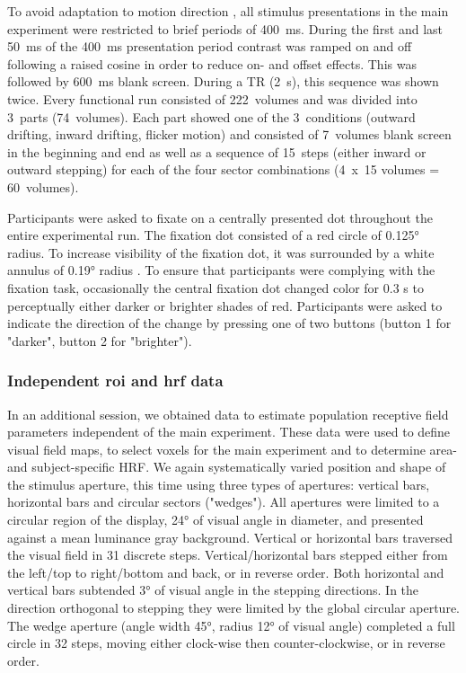 To avoid adaptation to motion direction \parencite{Fu2004, Schellart2004}, all stimulus presentations in the main experiment were restricted to brief periods of 400~ms. During the first and last 50~ms of the 400~ms presentation period contrast was ramped on and off following a raised cosine in order to reduce on- and offset effects. This was followed by 600~ms blank screen. During a TR (2~s), this sequence was shown twice. Every functional run consisted of 222~volumes and was divided into 3~parts (74~volumes). Each part showed one of the 3~conditions (outward drifting, inward drifting, flicker motion) and consisted of 7~volumes blank screen in the beginning and end as well as a sequence of 15~steps (either inward or outward stepping) for each of the four sector combinations (4~x~15 volumes = 60~volumes).

Participants were asked to fixate on a centrally presented dot throughout the entire experimental run. The fixation dot consisted of a red circle of 0.125° radius. To increase visibility of the fixation dot, it was surrounded by a white annulus of 0.19° radius \parencite{Harvey2016}. To ensure that participants were complying with the fixation task, occasionally the central fixation dot changed color for 0.3 s to perceptually either darker or brighter shades of red. Participants were asked to indicate the direction of the change by pressing one of two buttons (button 1 for "darker", button 2 for "brighter").

\subsubsection{Independent roi and hrf data}
In an additional session, we obtained data to estimate population receptive field parameters independent of the main experiment. These data were used to define visual field maps, to select voxels for the main experiment and to determine area- and subject-specific HRF. We again systematically varied position and shape of the stimulus aperture, this time using three types of apertures: vertical bars, horizontal bars and circular sectors ("wedges"). All apertures were limited to a circular region of the display, 24° of visual angle in diameter, and presented against a mean luminance gray background. Vertical or horizontal bars traversed the visual field in 31 discrete steps. Vertical/horizontal bars stepped either from the left/top to right/bottom and back, or in reverse order. Both horizontal and vertical bars subtended 3° of visual angle in the stepping directions. In the direction orthogonal to stepping they were limited by the global circular aperture. The wedge aperture (angle width 45°, radius 12° of visual angle) completed a full circle in 32 steps, moving either clock-wise then counter-clockwise, or in reverse order.

